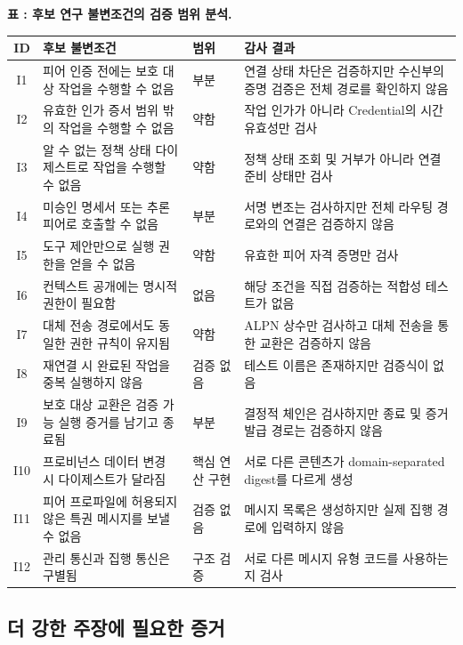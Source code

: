 \documentclass[10pt]{article}
\begin{document}
\begin{center}
\footnotesize
{}
\label{tab:invariants}
\textbf{표 \thetable: 후보 연구 불변조건의 검증 범위 분석.}\\[4pt]
\begin{tabularx}{\textwidth}{@{}c Y l Y@{}}
\toprule
ID & 후보 불변조건 & 범위 & 감사 결과 \\
\midrule
I1 & 피어 인증 전에는 보호 대상 작업을 수행할 수 없음 & 부분 & 연결 상태 차단은 검증하지만 수신부의 증명 검증은 전체 경로를 확인하지 않음 \\
I2 & 유효한 인가 증서 범위 밖의 작업을 수행할 수 없음 & 약함 & 작업 인가가 아니라 Credential의 시간 유효성만 검사 \\
I3 & 알 수 없는 정책 상태 다이제스트로 작업을 수행할 수 없음 & 약함 & 정책 상태 조회 및 거부가 아니라 연결 준비 상태만 검사 \\
I4 & 미승인 명세서 또는 추론 피어로 호출할 수 없음 & 부분 & 서명 변조는 검사하지만 전체 라우팅 경로와의 연결은 검증하지 않음 \\
I5 & 도구 제안만으로 실행 권한을 얻을 수 없음 & 약함 & 유효한 피어 자격 증명만 검사 \\
I6 & 컨텍스트 공개에는 명시적 권한이 필요함 & 없음 & 해당 조건을 직접 검증하는 적합성 테스트가 없음 \\
I7 & 대체 전송 경로에서도 동일한 권한 규칙이 유지됨 & 약함 & ALPN 상수만 검사하고 대체 전송을 통한 교환은 검증하지 않음 \\
I8 & 재연결 시 완료된 작업을 중복 실행하지 않음 & 검증 없음 & 테스트 이름은 존재하지만 검증식이 없음 \\
I9 & 보호 대상 교환은 검증 가능 실행 증거를 남기고 종료됨 & 부분 & 결정적 체인은 검사하지만 종료 및 증거 발급 경로는 검증하지 않음 \\
I10 & 프로비넌스 데이터 변경 시 다이제스트가 달라짐 & 핵심 연산 구현 & 서로 다른 콘텐츠가 domain-separated digest를 다르게 생성 \\
I11 & 피어 프로파일에 허용되지 않은 특권 메시지를 보낼 수 없음 & 검증 없음 & 메시지 목록은 생성하지만 실제 집행 경로에 입력하지 않음 \\
I12 & 관리 통신과 집행 통신은 구별됨 & 구조 검증 & 서로 다른 메시지 유형 코드를 사용하는지 검사 \\
\bottomrule
\end{tabularx}
\end{center}

\subsection{더 강한 주장에 필요한 증거}
\end{document}
